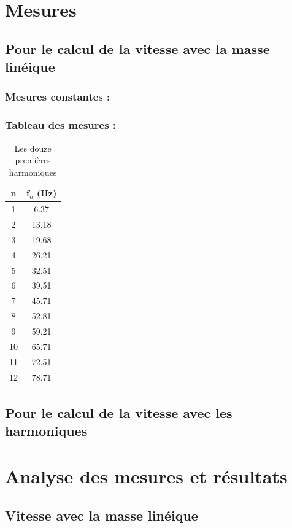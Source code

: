 \documentclass[12pt,a4paper]{article}
\begin{document}
    \section{Mesures}
    \subsection{Pour le calcul de la vitesse avec la masse linéique}
    \subsubsection{Mesures constantes :}
    \subsubsection{Tableau des mesures :}

    \begin{table}[htbp]
        \centering
        \begin{tabular}{c|c}
            \toprule
            n & f$_n$ (Hz) \\
            \midrule
            1  & 6.37  \\
            2  & 13.18 \\
            3  & 19.68 \\
            4  & 26.21 \\
            5  & 32.51 \\
            6  & 39.51 \\
            7  & 45.71 \\
            8  & 52.81 \\
            9  & 59.21 \\
            10 & 65.71 \\
            11 & 72.51 \\
            12 & 78.71 \\
            \bottomrule
        \end{tabular}
        \caption{Les douze premières harmoniques}
    \end{table}

    \subsection{Pour le calcul de la vitesse avec les harmoniques}
    \section{Analyse des mesures et résultats}
    \subsection{Vitesse avec la masse linéique}
\end{document}
